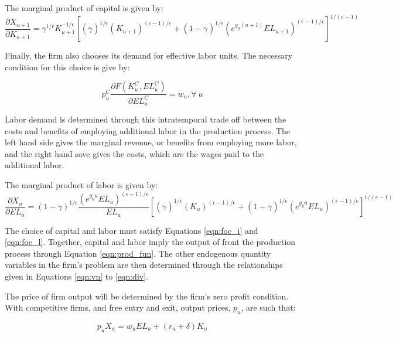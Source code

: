\noindent\noindent The marginal product of capital is given by:
\begin{equation}
\label{eqn:mpk}
\frac{\partial X_{u+1}}{\partial K_{u+1}} =  \gamma^{1/\epsilon}K_{u+1}^{-1/\epsilon}\left[(\gamma_{})^{1/\epsilon_{}}(K_{u+1})^{(\epsilon-1)/\epsilon_{}}+(1-\gamma_{})^{1/\epsilon_{}}(e^{g_{y}(u+1)}EL_{u+1})^{(\epsilon_{}-1)/\epsilon_{}}\right]^{1/(\epsilon_{}-1)}
\end{equation}


Finally, the firm also chooses its demand for effective labor units.  The necessary condition for this choice is give by:

\begin{equation}
\label{eqn:foc_l}
p^{C}_{u}\frac{\partial F(K^{C}_{u},EL^{C}_{u})}{\partial EL^{C}_{u}}=w_{u}, \forall \ u
\end{equation}

\noindent\noindent Labor demand is determined through this intratemporal trade off between the costs and benefits of employing additional labor in the production process.  The left hand side gives the marginal revenue, or benefits from employing more labor, and the right hand save gives the costs, which are the wages paid to the additional labor.

\noindent\noindent The marginal product of labor is given by:
\begin{equation}
\label{eqn:mpk}
\frac{\partial X_{u}}{\partial EL_{u}} =  (1-\gamma)^{1/\epsilon}\frac{(e^{g_{y}u}EL_{u})^{(\epsilon-1)/\epsilon}}{EL_{u}}\left[(\gamma_{})^{1/\epsilon_{}}(K_{u})^{(\epsilon-1)/\epsilon_{}}+(1-\gamma_{})^{1/\epsilon_{}}(e^{g_{y}u}EL_{u})^{(\epsilon_{}-1)/\epsilon_{}}\right]^{1/(\epsilon_{}-1)}
\end{equation}

The choice of capital and labor must satisfy Equations \ref{eqn:foc_i} and \ref{eqn:foc_l}.  Together, capital and labor imply the output of front the production process through Equation \ref{eqn:prod_fun}.  The other endogenous quantity variables in the firm's problem are then determined through the relationships given in Equations \ref{eqn:vn} to \ref{eqn:div}.

The price of firm output will be determined by the firm's zero profit condition.  With competitive firms, and free entry and exit, output prices, $p_{u}$, are such that:

\begin{equation}
p_{u}X_{u}=w_{u}EL_{u}+(r_{u}+\delta)K_{u}
\end{equation}

